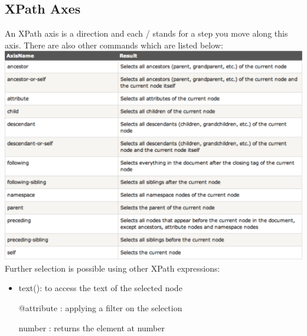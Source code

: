 \subsection{XPath Axes}
An XPath axis is a direction and each / stands for a step you move along this axis. There are also other commands which are listed below:
\includegraphics[width=\textwidth]{fig/XPathAxes.png}
Further selection is possible using other XPath expressions:
\begin{itemize}
	\item text(): to access the text of the selected node
	\item [@attribute]: applying a filter on the selection
	\item [number]: returns the element at number
\end{itemize}


